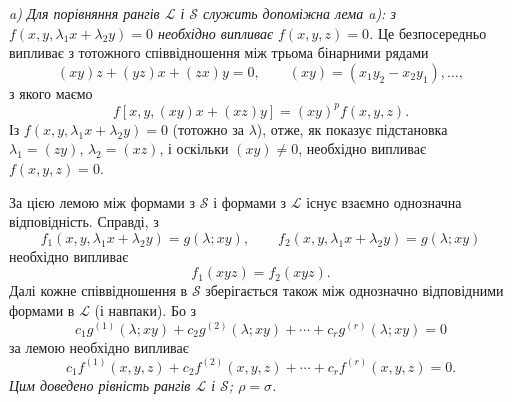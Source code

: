 \documentclass[11pt]{article}
\begin{document}
\emph{a) Для порівняння рангів $\mathcal L$ і $\mathcal S$ служить допоміжна лема a): з $f(x,y,\lambda_1x+\lambda_2y)=0$ необхідно випливає $f(x,y,z)=0$.} Це безпосередньо випливає з тотожного співвідношення між трьома бінарними рядами
\[
  (xy)z+(yz)x+(zx)y=0,
  \qquad (xy)=(x_1y_2-x_2y_1),\ldots,
\]
з якого маємо
\[
  f[x,y,(xy)x+(xz)y]=(xy)^p f(x,y,z).
\]
Із $f(x,y,\lambda_1x+\lambda_2y)=0$ (тотожно за $\lambda$), отже, як показує підстановка $\lambda_1=(zy)$, $\lambda_2=(xz)$, і оскільки $(xy)\ne0$, необхідно випливає $f(x,y,z)=0$.

За цією лемою між формами з $\mathcal S$ і формами з $\mathcal L$ існує взаємно однозначна відповідність. Справді, з
\[
  f_1(x,y,\lambda_1x+\lambda_2y)=g(\lambda;xy),\qquad
  f_2(x,y,\lambda_1x+\lambda_2y)=g(\lambda;xy)
\]
необхідно випливає
\[
  f_1(xyz)=f_2(xyz).
\]
Далі кожне співвідношення в $\mathcal S$ зберігається також між однозначно відповідними формами в $\mathcal L$ (і навпаки). Бо з
\[
  c_1g^{(1)}(\lambda;xy)+c_2g^{(2)}(\lambda;xy)+\cdots+c_rg^{(r)}(\lambda;xy)=0
\]
за лемою необхідно випливає
\[
  c_1f^{(1)}(x,y,z)+c_2f^{(2)}(x,y,z)+\cdots+c_rf^{(r)}(x,y,z)=0.
\]
\emph{Цим доведено рівність рангів $\mathcal L$ і $\mathcal S$; $\rho=\sigma$.}
\end{document}
